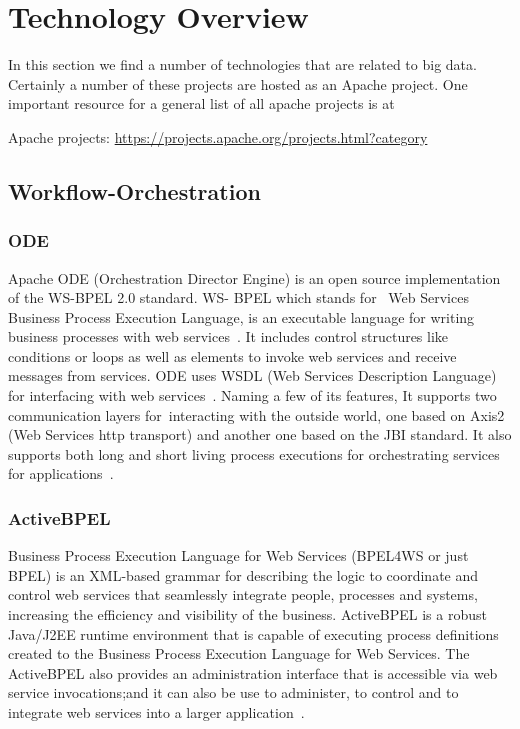 \FILENAME

\chapter{Technology Overview}
\label{S:BD-tech}


In this section we find a number of technologies that are related to
big data. Certainly a number of these projects are hosted as an Apache
project. One important resource for a general list of all apache
projects is at


Apache projects: \url{https://projects.apache.org/projects.html?category}


\section{Workflow-Orchestration}
\label{S:o-workflow}

\subsection{ODE}

Apache ODE (Orchestration Director Engine) is an open source
implementation of the WS-BPEL 2.0 standard. WS- BPEL which stands for 
Web Services Business Process Execution Language, is an executable
language for writing business processes with web
services~\cite{www-bpel-wiki}.  It includes control structures like
conditions or loops as well as elements to invoke web services and
receive messages from services.  ODE uses WSDL (Web Services
Description Language) for interfacing with web
services~\cite{www-ode-wiki}. Naming a few of its features, It
supports two communication layers for interacting with the outside
world, one based on Axis2 (Web Services http transport) and another
one based on the JBI standard. It also supports both long and short
living process executions for orchestrating services for
applications~\cite{www-ode-web}.

\subsection{ActiveBPEL}

Business Process Execution Language for Web Services (BPEL4WS or just
BPEL) is an XML-based grammar for describing the logic to coordinate
and control web services that seamlessly integrate people, processes
and systems, increasing the efficiency and visibility of the
business. ActiveBPEL is a robust Java/J2EE runtime environment that is
capable of executing process definitions created to the Business
Process Execution Language for Web Services. The ActiveBPEL also
provides an administration interface that is accessible via web
service invocations;and it can also be use to administer, to control
and to integrate web services into a larger
application~\cite{www-bpel}.


